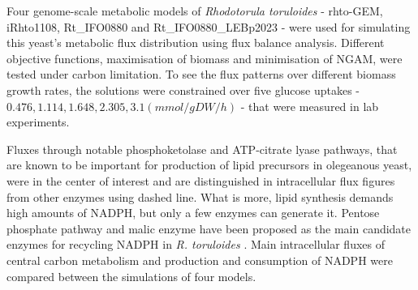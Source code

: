 


% 




Four genome-scale metabolic models of \textit{Rhodotorula toruloides} - rhto-GEM, iRhto1108, Rt\_IFO0880 and Rt\_IFO0880\_LEBp2023 - 
were used for simulating this yeast's metabolic flux distribution using flux balance analysis. 
Different objective functions, maximisation of biomass and minimisation
of NGAM, were tested under carbon limitation. 
To see the flux patterns over different biomass growth rates, the 
solutions were constrained over five glucose uptakes - $0.476, 1.114, 1.648, 2.305, 3.1  (mmol/gDW/h)$ - that were measured in lab experiments.

Fluxes through notable phosphoketolase and ATP-citrate lyase pathways, 
that are known to be important for production of lipid precursors in olegeanous yeast, were in the center of interest and are distinguished in intracellular 
flux figures from other enzymes using dashed line.
What is more, lipid synthesis demands high amounts of NADPH, but only a few enzymes can generate it. 
Pentose phosphate pathway and malic enzyme have been proposed as the main candidate enzymes for recycling NADPH in \textit{R. toruloides} 
\cite{Ratledge2014}. Main intracellular fluxes of central carbon metabolism and production and consumption of NADPH were compared between the simulations 
of four models. 

